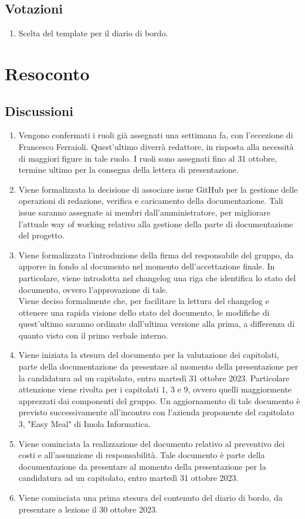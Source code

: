 \documentclass[12pt]{article}
\begin{document}
\subsection{Votazioni} \label{subsec:votazione}
\begin{enumerate}
    \item Scelta del template per il diario di bordo.
\end{enumerate}
\section{Resoconto} \label{sec:resoconto}
\subsection{Discussioni} \label{subsec:resdiscussione}
\begin{enumerate}
    \item Vengono confermati i ruoli già assegnati una settimana fa, con l'eccezione di Francesco Ferraioli. Quest'ultimo diverrà redattore, in risposta alla necessità di maggiori figure in tale ruolo. I ruoli sono assegnati fino al 31 ottobre, termine ultimo per la consegna della lettera di presentazione.
    \item Viene formalizzata la decisione di associare issue GitHub per la gestione delle operazioni di redazione, verifica e caricamento della documentazione. Tali issue saranno assegnate ai membri dall'amministratore, per migliorare l'attuale way of working relativo alla gestione della parte di documentazione del progetto.
    \item Viene formalizzata l'introduzione della firma del responsabile del gruppo, da apporre in fondo al documento nel momento dell'accettazione finale. In particolare, viene introdotta nel changelog una riga che identifica lo stato del documento, ovvero l'approvazione di tale.\\
    Viene deciso formalmente che, per facilitare la lettura del changelog e ottenere una rapida visione dello stato del documento, le modifiche di quest'ultimo saranno ordinate dall'ultima versione alla prima, a differenza di quanto visto con il primo verbale interno.
    \item Viene iniziata la stesura del documento per la valutazione dei capitolati, parte della documentazione da presentare al momento della presentazione per la candidatura ad un capitolato, entro martedì 31 ottobre 2023. Particolare attenzione viene rivolta per i capitolati 1, 3 e 9, ovvero quelli maggiormente apprezzati dai componenti del gruppo. Un aggiornamento di tale documento è previsto successivamente all'incontro con l'azienda proponente del capitolato 3, "Easy Meal" di Imola Informatica.
    \item Viene cominciata la realizzazione del documento relativo al preventivo dei costi e all'assunzione di responsabilità. Tale documento è parte della documentazione da presentare al momento della presentazione per la candidatura ad un capitolato, entro martedì 31 ottobre 2023.
    \item Viene cominciata una prima stesura del contenuto del diario di bordo, da presentare a lezione il 30 ottobre 2023.
    

\end{enumerate}
\end{document}
